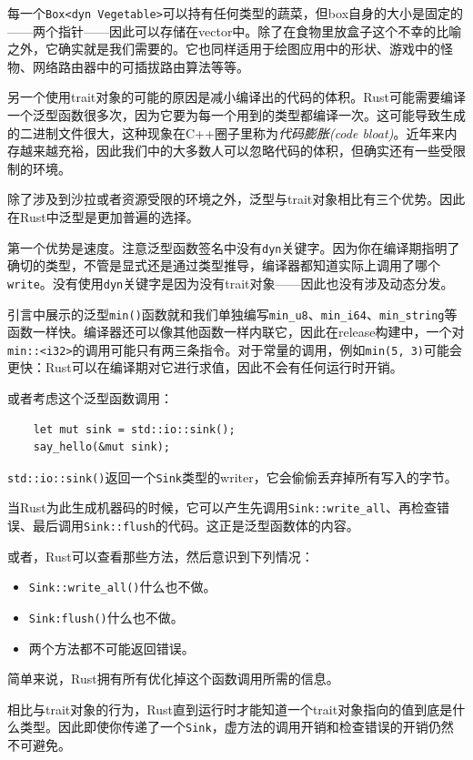 每一个\texttt{Box<dyn Vegetable>}可以持有任何类型的蔬菜，但box自身的大小是固定的——两个指针——因此可以存储在vector中。除了在食物里放盒子这个不幸的比喻之外，它确实就是我们需要的。它也同样适用于绘图应用中的形状、游戏中的怪物、网络路由器中的可插拔路由算法等等。

另一个使用trait对象的可能的原因是减小编译出的代码的体积。Rust可能需要编译一个泛型函数很多次，因为它要为每一个用到的类型都编译一次。这可能导致生成的二进制文件很大，这种现象在C++圈子里称为\emph{代码膨胀(code bloat)}。近年来内存越来越充裕，因此我们中的大多数人可以忽略代码的体积，但确实还有一些受限制的环境。

除了涉及到沙拉或者资源受限的环境之外，泛型与trait对象相比有三个优势。因此在Rust中泛型是更加普遍的选择。

第一个优势是速度。注意泛型函数签名中没有\texttt{dyn}关键字。因为你在编译期指明了确切的类型，不管是显式还是通过类型推导，编译器都知道实际上调用了哪个\texttt{write}。没有使用\texttt{dyn}关键字是因为没有trait对象——因此也没有涉及动态分发。

引言中展示的泛型\texttt{min()}函数就和我们单独编写\texttt{min\_u8}、\texttt{min\_i64}、\texttt{min\_string}等函数一样快。编译器还可以像其他函数一样内联它，因此在release构建中，一个对\texttt{min::<i32>}的调用可能只有两三条指令。对于常量的调用，例如\texttt{min(5, 3)}可能会更快：Rust可以在编译期对它进行求值，因此不会有任何运行时开销。

或者考虑这个泛型函数调用：
\begin{verbatim}
    let mut sink = std::io::sink();
    say_hello(&mut sink);
\end{verbatim}

\texttt{std::io::sink()}返回一个\texttt{Sink}类型的writer，它会偷偷丢弃掉所有写入的字节。

当Rust为此生成机器码的时候，它可以产生先调用\texttt{Sink::write\_all}、再检查错误、最后调用\texttt{Sink::flush}的代码。这正是泛型函数体的内容。

或者，Rust可以查看那些方法，然后意识到下列情况：
\begin{itemize}
    \item \texttt{Sink::write\_all()}什么也不做。
    \item \texttt{Sink:flush()}什么也不做。
    \item 两个方法都不可能返回错误。
\end{itemize}

简单来说，Rust拥有所有优化掉这个函数调用所需的信息。

相比与trait对象的行为，Rust直到运行时才能知道一个trait对象指向的值到底是什么类型。因此即使你传递了一个\texttt{Sink}，虚方法的调用开销和检查错误的开销仍然不可避免。

